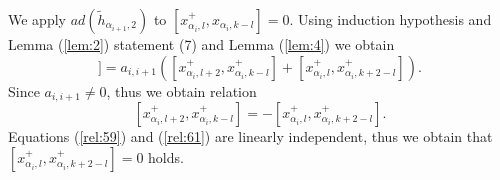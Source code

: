 \documentclass[english]{elsarticle}
\numberwithin{equation}{section}
\begin{document}
We apply $ad(\tilde{h}_{\alpha_{i+1},2})$ to $[x_{\alpha_i,l}^+,x_{\alpha_i,k-l}]=0$. Using induction hypothesis and Lemma (\ref{lem:2}) statement (7) and Lemma (\ref{lem:4}) we obtain
\begin{equation}
    [\tilde{h}_{\alpha_{i+1},2},[x_{\alpha_i,l}^+,x_{\alpha_i,k-l}]]=a_{i,i+1}([x_{\alpha_i,l+2}^+,x_{\alpha_i,k-l}^+]+[x_{\alpha_i,l}^+,x_{\alpha_i,k+2-l}^+]).
\end{equation}
Since $a_{i,i+1}\neq 0$, thus we obtain relation
\begin{equation}
\label{rel:61}
    [x_{\alpha_i,l+2}^+,x_{\alpha_i,k-l}^+]=-[x_{\alpha_i,l}^+,x_{\alpha_i,k+2-l}^+].
\end{equation}
Equations (\ref{rel:59}) and (\ref{rel:61}) are linearly independent, thus we obtain that $[x_{\alpha_i,l}^{+},x_{\alpha_i,k+2-l}^{+}]=0$ holds.\\
\end{document}
